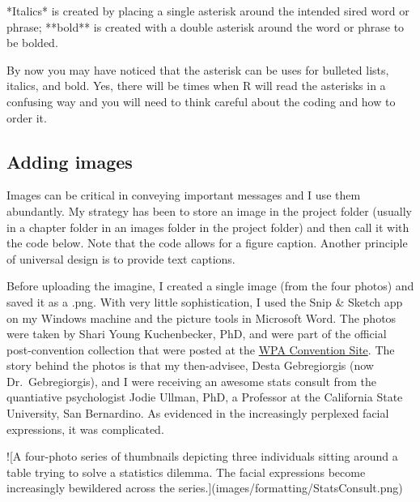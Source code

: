 \documentclass[
]{book}
\newenvironment{Shaded}{\begin{snugshade}}{\end{snugshade}}
\newcommand{\NormalTok}[1]{#1}
\newcommand{\SpecialCharTok}[1]{\textcolor[rgb]{0.00,0.00,0.00}{#1}}
\begin{document}
\begin{Shaded}
\begin{Highlighting}[]
\SpecialCharTok{*}\NormalTok{Italics}\SpecialCharTok{*}\NormalTok{ is created by placing a single asterisk around the intended sired word or phrase; }\SpecialCharTok{**}\NormalTok{bold}\SpecialCharTok{**}\NormalTok{ is created with a double asterisk around the word or phrase to be bolded.}
\end{Highlighting}
\end{Shaded}

By now you may have noticed that the asterisk can be uses for bulleted lists, italics, and bold. Yes, there will be times when R will read the asterisks in a confusing way and you will need to think careful about the coding and how to order it.

\hypertarget{adding-images}{%
\subsection{Adding images}\label{adding-images}}

Images can be critical in conveying important messages and I use them abundantly. My strategy has been to store an image in the project folder (usually in a chapter folder in an images folder in the project folder) and then call it with the code below. Note that the code allows for a figure caption. Another principle of universal design is to provide text captions.

Before uploading the imagine, I created a single image (from the four photos) and saved it as a .png. With very little sophistication, I used the Snip \& Sketch app on my Windows machine and the picture tools in Microsoft Word. The photos were taken by Shari Young Kuchenbecker, PhD, and were part of the official post-convention collection that were posted at the \href{https://westernpsych.org/2018-convention-photos/}{WPA Convention Site}. The story behind the photos is that my then-advisee, Desta Gebregiorgis (now Dr.~Gebregiorgis), and I were receiving an awesome stats consult from the quantiative psychologist Jodie Ullman, PhD, a Professor at the California State University, San Bernardino. As evidenced in the increasingly perplexed facial expressions, it was complicated.

\begin{Shaded}
\begin{Highlighting}[]
\SpecialCharTok{!}\NormalTok{[A four}\SpecialCharTok{{-}}\NormalTok{photo series of thumbnails depicting three individuals sitting around a table trying to solve a statistics dilemma. The facial expressions become increasingly bewildered across the series.](images}\SpecialCharTok{/}\NormalTok{formatting}\SpecialCharTok{/}\NormalTok{StatsConsult.png)}
\end{Highlighting}
\end{Shaded}
\end{document}
